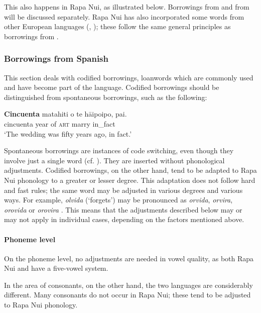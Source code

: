 This also happens in Rapa Nui, as illustrated below. Borrowings from  and from  will be discussed separately. Rapa Nui has also incorporated some words from other European languages (, ); these follow the same general principles as borrowings from .

\subsubsection[Borrowings from \ili{Spanish}]{Borrowings from Spanish}\label{sec:2.5.3.1}
This section deals with codified borrowings, loanwords which are commonly used and have become part of the language. Codified borrowings should be distinguished from spontaneous borrowings, such as the following:

\ea\label{ex:2.14}
\gll \textbf{Cincuenta} matahiti o te hāipoipo, pa{\ꞌ}i. \\
cincuenta year of \textsc{art} marry in\_fact \\

\glt
‘The wedding was fifty years ago, in fact.’ \textstyleExampleref{[R415.498]} 
\z

Spontaneous borrowings are instances of code switching, even though they involve just a single word (cf. \citealt{Fischer2007}). They are inserted without phonological adjustments. Codified borrowings, on the other hand, tend to be adapted to Rapa Nui phonology to a greater or lesser degree. This adaptation does not follow hard and fast rules; the same word may be adjusted in various degrees and various ways. For example, \textit{olvida} (‘forgets’) may be pronounced as \textit{orvida}, \textit{orvira}, \textit{orovida} or \textit{orovira} \citep[195]{Makihara2001Adaptation}. This means that the adjustments described below may or may not apply in individual cases, depending on the factors mentioned above.

\paragraph{Phoneme level} On the phoneme level, no adjustments are needed in vowel quality, as both Rapa Nui and  have a five-vowel system. 

In the area of consonants, on the other hand, the two languages are considerably different. Many  consonants do not occur in Rapa Nui; these tend to be adjusted to Rapa Nui phonology. 

